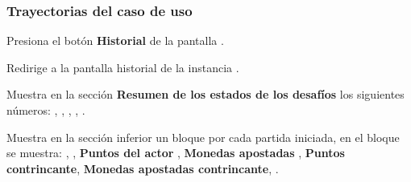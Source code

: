 \begin{UseCase}
{	}








\end{UseCase}

\subsubsection{Trayectorias del caso de uso}

\begin{UCtrayectoria}%
%

    \Actor Presiona el botón {\bf Historial} de la pantalla .

    \Sistema Redirige a la pantalla historial de la instancia .

    \Sistema Muestra en la sección {\bf Resumen de los estados de los desafíos} los siguientes números: , , , , .

    \Sistema Muestra en la sección inferior un bloque por cada partida iniciada, en el bloque se muestra: , , {\bf Puntos del actor} , {\bf Monedas apostadas} , {\bf Puntos contrincante}, {\bf Monedas apostadas contrincante}, .

\end{UCtrayectoria}
